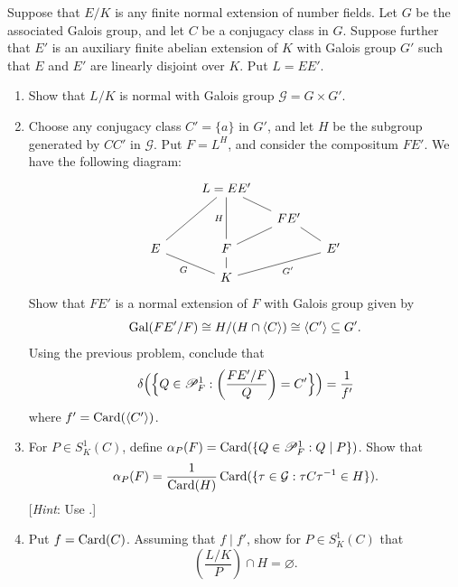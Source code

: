 \begin{exercise}[19]
  \label{ex:ch7-19}
  Suppose that $E/K$ is any finite normal extension of number fields. Let $G$
  be the associated Galois group, and let $C$ be a conjugacy class in $G$.
  Suppose further that $E'$ is an auxiliary finite abelian extension of $K$
  with Galois group $G'$ such that $E$ and $E'$ are linearly disjoint over
  $K$. Put $L = EE'$.
  \begin{enumerate}[label=(\alph*)]
    \item Show that $L/K$ is normal with Galois group
      $\mathcal{G} = G \times G'$.
    \item Choose any conjugacy class $C' = \{a\}$ in $G'$, and let $H$ be the
      subgroup generated by $CC'$ in $\mathcal{G}$. Put $F = L^H$, and
      consider the compositum $FE'$. We have the following diagram:
      \[
        \begin{tikzcd}[row sep=small, column sep=small]
          & & L = EE' \arrow[ddll, dash] \arrow[dd, dash, "H"']
            \arrow[dr, dash] & & \\
          & & & FE' \arrow[dl, dash] \arrow[dr, dash] & \\
          E \arrow[drr, dash, "G"'] & & F \arrow[d, dash] & &
            E' \arrow[dll, dash, "G'"] \\
          & & K & &
        \end{tikzcd}
      \]
      Show that $FE'$ is a normal extension of $F$ with Galois group given by
      \[
        \operatorname{Gal}(FE'/F) \cong H/(H \cap \langle C \rangle)
        \cong \langle C' \rangle \subseteq G'.
      \]
      Using the previous problem, conclude that
      \[
        \delta\Bigl(\Bigl\{Q \in \mathscr{P}_F^1 :
        \left(\frac{FE'/F}{Q}\right) = C'\Bigr\}\Bigr) = \frac{1}{f'}
      \]
      where $f' = \operatorname{Card}(\langle C' \rangle)$.
    \item For $P \in S_K^1(C)$, define
      $\alpha_P(F) = \operatorname{Card}(\{Q \in \mathscr{P}_F^1 : Q \mid P\})$.
      Show that
      \[
        \alpha_P(F) = \frac{1}{\operatorname{Card}(H)}
        \operatorname{Card}(\{\tau \in \mathcal{G} : \tau C \tau^{-1} \in H\}).
      \]
      [\emph{Hint}: Use .]
    \item Put $f = \operatorname{Card}(C)$. Assuming that $f \mid f'$, show
      for $P \in S_K^1(C)$ that
      \[
        \left(\frac{L/K}{P}\right) \cap H = \varnothing.
      \]
  \end{enumerate}
\end{exercise}

